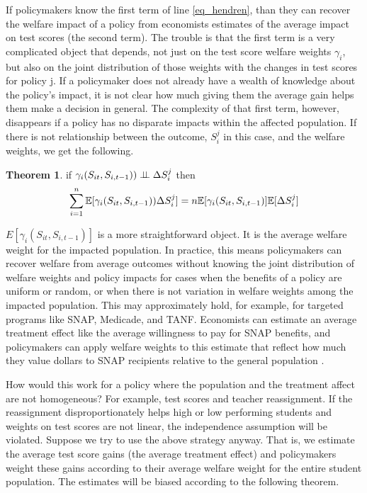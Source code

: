 \documentclass[12pt]{article}
\theoremstyle{definition}
\theoremstyle{definition}
\theoremstyle{definition}
\theoremstyle{definition}
\newtheorem{thm}{Theorem}
\begin{document}
    If policymakers know the first term of line \ref{eq_hendren}, than they can recover the welfare impact of a policy from economists estimates of the average impact on test scores (the second term). The trouble is that the first term is a very complicated object that depends, not just on the test score welfare weights $\gamma_i$, but also on the joint distribution of those weights with the changes in test scores for policy j. If a policymaker does not already have a wealth of knowledge about the policy's impact, it is not clear how much giving them the average gain helps them make a decision in general. The complexity of that first term, however, disappears if a policy has no disparate impacts within the affected population. If there is not relationship between the outcome, $ S_i^j$ in this case, and the welfare weights, we get the following. 
    
    \begin{thm}
    \label{pol_indep}
    if $\gamma_i(S_{it}, S_{i,t-1})) \perp \!\!\! \perp \Delta S_i^j$ then 
    \begin{equation}
        \sum_{i=1}^n \mathbb{E}[\gamma_i(S_{it}, S_{i,t-1})) \Delta S_i^j]= n\mathbb{E}[\gamma_i(S_{it}, S_{i,t-1})]\mathbb{E}[\Delta S_i^j]
    \end{equation}
    \end{thm}
    

    $E[\gamma_i(S_{it}, S_{i,t-1})]$ is a more straightforward object. It is the average welfare weight for the impacted population. In practice, this means policymakers can recover welfare from average outcomes without knowing the joint distribution of welfare weights and policy impacts for cases when the benefits of a policy are uniform or random, or when there is not variation in welfare weights among the impacted population. This may approximately hold, for example, for targeted programs like SNAP, Medicade, and TANF. Economists can estimate an average treatment effect like the average willingness to pay for SNAP benefits, and policymakers can apply welfare weights to this estimate that reflect how much they value dollars to SNAP recipients relative to the general population \citep{Keyser_2020}. 

    How would this work for a policy where the population and the treatment affect are not homogeneous?  For example, test scores and teacher reassignment. If the reassignment disproportionately helps high or low performing students and weights on test scores are not linear, the independence assumption will be violated. Suppose we try to use the above strategy anyway. That is, we estimate the average test score gains (the average treatment effect) and policymakers weight these gains according to their average welfare weight for the entire student population. The estimates will be biased according to the following theorem. 
\end{document}
